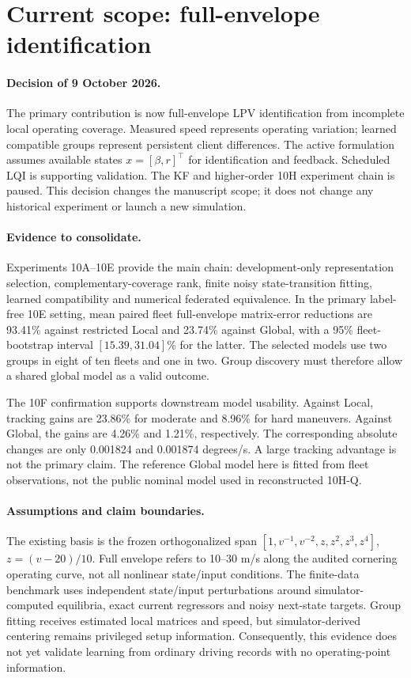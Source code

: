 \section{Current scope: full-envelope identification}
\label{sec:current-scope}
\paragraph{Decision of 9 October 2026.}
The primary contribution is now full-envelope LPV identification from incomplete
local operating coverage. Measured speed represents operating variation;
learned compatible groups represent persistent client differences. The active
formulation assumes available states $x=[\beta,r]^\top$ for identification and
feedback. Scheduled LQI is supporting validation. The KF and higher-order
10H experiment chain is paused. This decision changes the manuscript scope;
it does not change any historical experiment or launch a new simulation.

\paragraph{Evidence to consolidate.}
Experiments 10A--10E provide the main chain: development-only representation
selection, complementary-coverage rank, finite noisy state-transition fitting,
learned compatibility and numerical federated equivalence. In the primary
label-free 10E setting, mean paired fleet full-envelope matrix-error reductions
are 93.41\% against restricted Local and 23.74\% against Global, with a
95\% fleet-bootstrap interval $[15.39,31.04]\%$ for the latter. The selected
models use two groups in eight of ten fleets and one in two. Group discovery
must therefore allow a shared global model as a valid outcome.

The 10F confirmation supports downstream model usability. Against Local,
tracking gains are 23.86\% for moderate and 8.96\% for hard maneuvers. Against
Global, the gains are 4.26\% and 1.21\%, respectively. The corresponding
absolute changes are only 0.001824 and 0.001874 degrees/s. A large tracking
advantage is not the primary
claim. The reference Global model here is fitted from fleet observations,
not the public nominal model used in reconstructed 10H-Q.

\paragraph{Assumptions and claim boundaries.}
The existing basis is the frozen orthogonalized span
$[1,v^{-1},v^{-2},z,z^2,z^3,z^4]$, $z=(v-20)/10$. Full envelope refers to
10--30 m/s along the audited cornering operating curve, not all nonlinear
state/input conditions. The finite-data benchmark uses independent state/input
perturbations around simulator-computed equilibria, exact current regressors
and noisy next-state targets. Group fitting receives estimated local matrices
and speed, but simulator-derived centering remains privileged setup information.
Consequently, this evidence does not yet validate learning from ordinary driving
records with no operating-point information.


